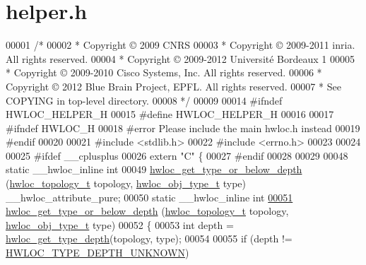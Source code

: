 \hypertarget{a00031_source}{
\section{helper.h}
}

\begin{DoxyCode}
00001 \textcolor{comment}{/*}
00002 \textcolor{comment}{ * Copyright © 2009 CNRS}
00003 \textcolor{comment}{ * Copyright © 2009-2011 inria.  All rights reserved.}
00004 \textcolor{comment}{ * Copyright © 2009-2012 Université Bordeaux 1}
00005 \textcolor{comment}{ * Copyright © 2009-2010 Cisco Systems, Inc.  All rights reserved.}
00006 \textcolor{comment}{ * Copyright © 2012 Blue Brain Project, EPFL. All rights reserved.}
00007 \textcolor{comment}{ * See COPYING in top-level directory.}
00008 \textcolor{comment}{ */}
00009 
00014 \textcolor{preprocessor}{#ifndef HWLOC\_HELPER\_H}
00015 \textcolor{preprocessor}{}\textcolor{preprocessor}{#define HWLOC\_HELPER\_H}
00016 \textcolor{preprocessor}{}
00017 \textcolor{preprocessor}{#ifndef HWLOC\_H}
00018 \textcolor{preprocessor}{}\textcolor{preprocessor}{#error Please include the main hwloc.h instead}
00019 \textcolor{preprocessor}{}\textcolor{preprocessor}{#endif}
00020 \textcolor{preprocessor}{}
00021 \textcolor{preprocessor}{#include <stdlib.h>}
00022 \textcolor{preprocessor}{#include <errno.h>}
00023 
00024 
00025 \textcolor{preprocessor}{#ifdef \_\_cplusplus}
00026 \textcolor{preprocessor}{}\textcolor{keyword}{extern} \textcolor{stringliteral}{"C"} \{
00027 \textcolor{preprocessor}{#endif}
00028 \textcolor{preprocessor}{}
00029 
00048 \textcolor{keyword}{static} \_\_hwloc\_inline \textcolor{keywordtype}{int}
00049 \hyperlink{a00052_ga081be77905201e9f42318e9974456b45}{hwloc_get_type_or_below_depth} (\hyperlink{a00039_ga9d1e76ee15a7dee158b786c30b6a6e38}{hwloc_topology_t} topology, \hyperlink{a00041_gacd37bb612667dc437d66bfb175a8dc55}{hwloc_obj_type_t} type) 
      \_\_hwloc\_attribute\_pure;
00050 \textcolor{keyword}{static} \_\_hwloc\_inline \textcolor{keywordtype}{int}
\hypertarget{a00031_source_l00051}{}\hyperlink{a00052_ga081be77905201e9f42318e9974456b45}{00051} \hyperlink{a00052_ga081be77905201e9f42318e9974456b45}{hwloc_get_type_or_below_depth} (\hyperlink{a00039_ga9d1e76ee15a7dee158b786c30b6a6e38}{hwloc_topology_t} topology, \hyperlink{a00041_gacd37bb612667dc437d66bfb175a8dc55}{hwloc_obj_type_t} type)
00052 \{
00053   \textcolor{keywordtype}{int} depth = \hyperlink{a00046_gaea7c64dd59467f5201ba87712710b14d}{hwloc_get_type_depth}(topology, type);
00054 
00055   \textcolor{keywordflow}{if} (depth != \hyperlink{a00046_ggaf4e663cf42bbe20756b849c6293ef575a0565ab92ab72cb0cec91e23003294aad}{HWLOC_TYPE_DEPTH_UNKNOWN})

\end{DoxyCode}
